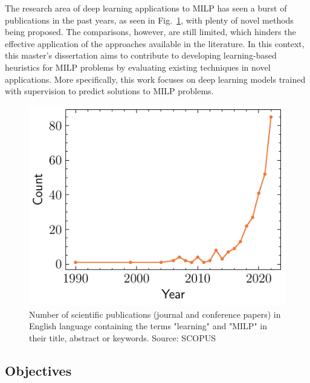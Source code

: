 The research area of deep learning applications to MILP has seen a burst of publications in the past years, as seen in Fig.~\ref{fig:scopus-trend}, with plenty of novel methods being proposed.
The comparisons, however, are still limited, which hinders the effective application of the approaches available in the literature.
In this context, this master’s dissertation aims to contribute to developing learning-based heuristics for MILP problems by evaluating existing techniques in novel applications.
More specifically, this work focuses on deep learning models trained with supervision to predict solutions to MILP problems.

\begin{figure}[h]
    \centering
    \includegraphics{pictures/scopus.pdf}
    \caption{Number of scientific publications (journal and conference papers) in English language containing the terms "learning" and "MILP" in their title, abstract or keywords. Source: SCOPUS}
    \label{fig:scopus-trend}
\end{figure}

\subsection*{Objectives}\label{chap:objectives}

